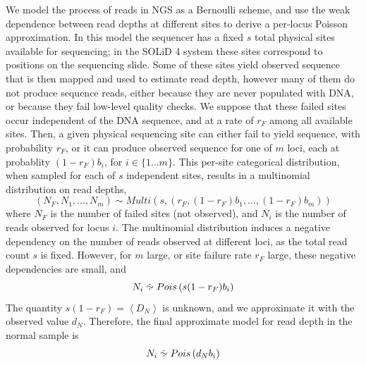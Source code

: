 \documentclass[dissertation.tex]{subfiles}
\begin{document}
We model the process of reads in \gls{NGS} as a Bernoulli scheme, and use the weak dependence between read depths at different sites to derive a per-locus Poisson approximation.  In this model the sequencer has a fixed $s$ total physical sites available for sequencing; in the SOLiD 4 system these sites correspond to positions on the sequencing slide.  Some of these sites yield observed sequence that is then mapped and used to estimate read depth, however many of them do not produce sequence reads, either because they are never populated with DNA, or because they fail low-level quality checks.  We suppose that these failed sites occur independent of the DNA sequence, and at a rate of $r_F$ among all available sites.  Then, a given physical sequencing site can either fail to yield sequence, with probability $r_F$, or it can produce observed sequence for one of $m$ loci, each at probablity $(1-r_F)b_i$, for $i \in \{1 \dots m\}$.  This per-site categorical distribution, when sampled for each of $s$ independent sites, results in a multinomial distribution on read depths,
\begin{equation}
\left(N_F, N_1, \dots, N_m\right) \sim Multi\left(s, \left(r_F, (1-r_F)b_1, \dots, (1-r_F)b_m\right)\right)
\end{equation}
where $N_F$ is the number of failed sites (not observed), and $N_i$ is the number of reads observed for locus $i$.  The multinomial distribution induces a negative dependency on the number of reads observed at different loci, as the total read count $s$ is fixed.  However, for $m$ large, or site failure rate $r_F$ large\cite{McDonald1980}, these negative dependencies are small, and 
\begin{equation}
  N_i \approxdist Pois\left(s (1-r_F) b_i\right)
\end{equation}
The quantity $s(1-r_F) = \left<D_N\right>$ is unknown, and we approximate it with the observed value $d_N$.  Therefore, the final approximate model for read depth in the normal sample is
\begin{equation}
  N_i \approxdist Pois\left(d_N b_i\right) \label{eq:comp_cnv_Npois}
\end{equation}
\end{document}
